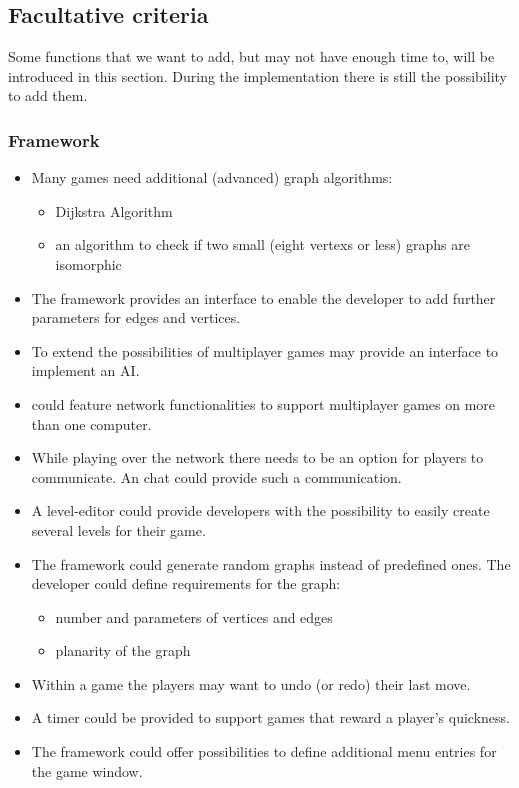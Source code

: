 \pagebreak
\subsection{Facultative criteria}\label{REF:FACULTATIVE-CRITERIA}
Some functions that we want to add, but may not have enough time to, will be introduced in this section. During the implementation there is still the possibility to add them.

\subsubsection{Framework}
\begin{itemize}

	\item Many \glspl{game} need additional (advanced) \gls{graph} \glspl{algorithm}:
	\begin{itemize}
		\item Dijkstra Algorithm
		\item an algorithm to check if two small (eight \glspl{vertex} or less) graphs are isomorphic
	\end{itemize}

	\item The framework provides an interface to enable the developer to add further parameters for edges and vertices.
	\item To extend the possibilities of multiplayer games \graphioli may provide an interface to implement an \gls{AI}.

	\item \graphioli could feature network functionalities to support multiplayer games on more than one computer.

	\item While playing over the network there needs to be an option for players to communicate. An \gls{chat} could provide such a communication.

	\item A \gls{level-editor} could provide \glspl{developer} with the possibility to easily create several levels for their game.

	\item The framework could generate random graphs instead of predefined ones. The developer could define requirements for the graph:
	\begin{itemize}
		\item number and parameters of vertices and edges
		\item planarity of the graph
	\end{itemize}

	\item Within a game the players may want to \gls{undo} (or \gls{redo}) their last move.

	\item A timer could be provided to support games that reward a player's quickness.

	\item The framework could offer possibilities to define additional menu entries for the game window.

\end{itemize}

